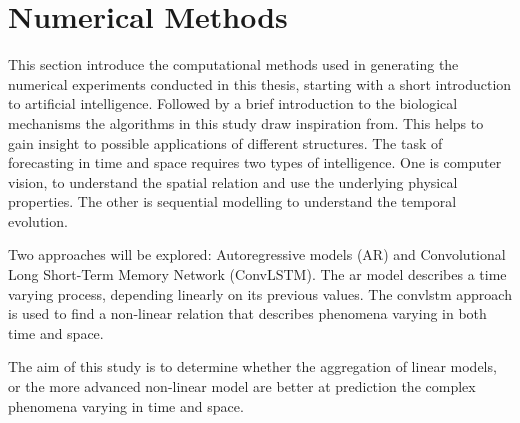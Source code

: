 \chapter{Numerical Methods} \label{ch:num_methods}
This section introduce the computational methods used in generating the numerical experiments conducted in this thesis, starting with a short introduction to artificial intelligence. Followed by a brief introduction to the biological mechanisms the algorithms in this study draw inspiration from. This helps to gain insight to possible applications of different structures.
The task of forecasting in time and space requires two types of intelligence. One is computer vision, to understand the spatial relation and use the underlying physical properties. The other is sequential modelling to understand the temporal evolution.

Two approaches will be explored: Autoregressive models (AR) and Convolutional Long Short-Term Memory Network (ConvLSTM). The \acrshort{ar} model describes a time varying process, depending linearly on its previous values. The \acrshort{convlstm} approach is used to find a non-linear relation that describes phenomena varying in both time and space.

The aim of this study is to determine whether the aggregation of linear models, or the more advanced non-linear model are better at prediction the complex phenomena varying in time and space.


